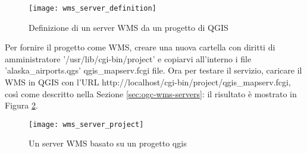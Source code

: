 \begin{figure}[ht]
\centering
\texttt{[image: wms\_server\_definition]}
\caption{Definizione di un server WMS da un progetto di QGIS \wincaption}
\label{fig:wmsdefinition}
\end{figure}

Per fornire il progetto come WMS, creare una nuova cartella con diritti di amministratore '/usr/lib/cgi-bin/project' e 
copiarvi all'interno i file 'alaska\_airports.qgs' qgis\_mapserv.fcgi file.
Ora per testare il servizio, caricare il WMS in QGIS con l'URL http://localhost/cgi-bin/project/qgis\_mapserv.fcgi, 
così come descritto nella Sezione \ref{sec:ogc-wms-servers}: il risultato è mostrato in Figura \ref{fig:wmsproject}.

\begin{figure}[ht]
\centering
\texttt{[image: wms\_server\_project]}
\caption{Un server WMS basato su un progetto qgis \nixcaption}
\label{fig:wmsproject}
\end{figure}

\FloatBarrier
